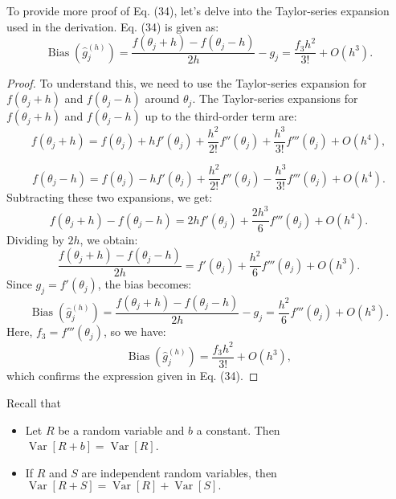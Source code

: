 To provide more proof of Eq. (34), let's delve into the Taylor-series expansion used in the derivation. Eq. (34) is given as:
\begin{equation}
    \operatorname{Bias}\left(\hat{g}_j^{(h)}\right) = \frac{f\left(\theta_j + h\right) - f\left(\theta_j - h\right)}{2h} - g_j = \frac{f_3 h^2}{3!} + O(h^3).
\end{equation}
\begin{proof}
    To understand this, we need to use the Taylor-series expansion for $f(\theta_j + h)$ and $f(\theta_j - h)$ around $\theta_j$. The Taylor-series expansions for $f(\theta_j + h)$ and $f(\theta_j - h)$ up to the third-order term are:
\begin{equation}
    f(\theta_j + h) = f(\theta_j) + h f'(\theta_j) + \frac{h^2}{2!} f''(\theta_j) + \frac{h^3}{3!} f'''(\theta_j) + O(h^4),
\end{equation}

\begin{equation}
    f(\theta_j - h) = f(\theta_j) - h f'(\theta_j) + \frac{h^2}{2!} f''(\theta_j) - \frac{h^3}{3!} f'''(\theta_j) + O(h^4).
\end{equation}
Subtracting these two expansions, we get:
\begin{equation}
    f(\theta_j + h) - f(\theta_j - h) = 2h f'(\theta_j) + \frac{2 h^3}{6} f'''(\theta_j) + O(h^4).
\end{equation}
Dividing by $2h$, we obtain:
\begin{equation}
    \frac{f(\theta_j + h) - f(\theta_j - h)}{2h} = f'(\theta_j) + \frac{h^2}{6} f'''(\theta_j) + O(h^3).
\end{equation}
Since $g_j = f'(\theta_j)$, the bias becomes:
\begin{equation}
    \operatorname{Bias}\left(\hat{g}_j^{(h)}\right) = \frac{f(\theta_j + h) - f(\theta_j - h)}{2h} - g_j = \frac{h^2}{6} f'''(\theta_j) + O(h^3).
\end{equation}
Here, $f_3 = f'''(\theta_j)$, so we have:
\begin{equation}
    \operatorname{Bias}\left(\hat{g}_j^{(h)}\right) = \frac{f_3 h^2}{3!} + O(h^3),
\end{equation}
which confirms the expression given in Eq. (34).
\end{proof}

Recall that
\begin{itemize}
    \item Let $R$ be a random variable and $b$ a constant. Then $\operatorname{Var}[R+b]=\operatorname{Var}[R]$.
    \item If $R$ and $S$ are independent random variables, then $\operatorname{Var}[R+S]=\operatorname{Var}[R]+\operatorname{Var}[S].$
\end{itemize}

